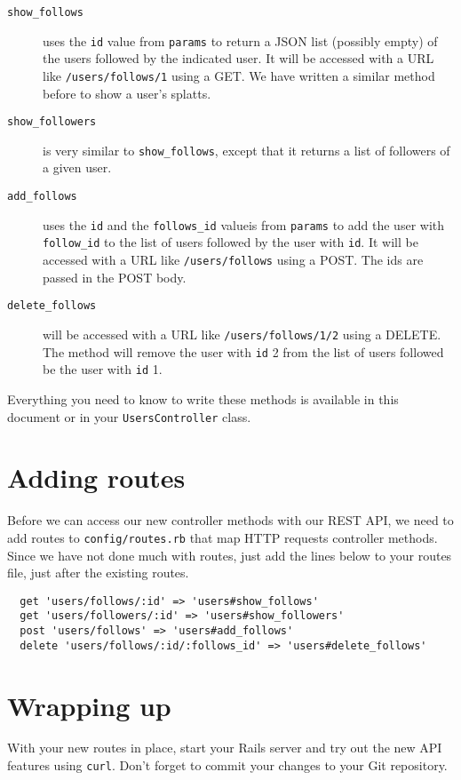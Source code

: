 \documentclass{article}
\begin{document}
\begin{description}
  \item[\texttt{show\_follows}] uses the \texttt{id} value from \texttt{params} to return a JSON list (possibly empty) of the users followed by the indicated user.  It will be accessed with a URL like \texttt{/users/follows/1} using a GET.  We have written a similar method before to show a user's splatts.
  \item[\texttt{show\_followers}]  is very similar to \texttt{show\_follows}, except that it returns a list of followers of a given user.
  \item[\texttt{add\_follows}] uses the \texttt{id} and the \texttt{follows\_id} valueis from \texttt{params} to add the user with \texttt{follow\_id} to the list of users followed by the user with \texttt{id}.  It will be accessed with a URL like \texttt{/users/follows} using a POST.  The ids are passed in the POST body.
  \item[\texttt{delete\_follows}]  will be accessed with a URL like \texttt{/users/follows/1/2} using a DELETE.  The method will remove the user with \texttt{id} 2 from the list of users followed be the user with \texttt{id} 1. 
\end{description}

Everything you need to know to write these methods is available in this document or in your \texttt{UsersController} class.

\section{Adding routes}
Before we can access our new controller methods with our REST API, we need to add routes to \texttt{config/routes.rb} that map HTTP requests controller methods.  Since we have not done much with routes, just add the lines below to your routes file, just after the existing routes.

\begin{verbatim}
  get 'users/follows/:id' => 'users#show_follows'
  get 'users/followers/:id' => 'users#show_followers'
  post 'users/follows' => 'users#add_follows'
  delete 'users/follows/:id/:follows_id' => 'users#delete_follows'
\end{verbatim}

\section{Wrapping up}
With your new routes in place, start your Rails server and try out the new API features using \texttt{curl}.  Don't forget to commit your changes to your Git repository.
\end{document}
